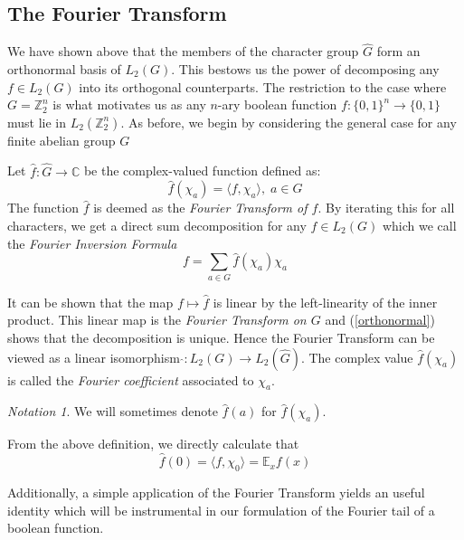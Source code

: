 \documentclass{amsart}
\theoremstyle{definition}
\theoremstyle{remark}
\numberwithin{equation}{section}
\theoremstyle{remark}
\newtheorem{notation}[theorem]{Notation}
\begin{document}
\subsection{The Fourier Transform}

We have shown above that the members of the character group $\hat{G}$ form an orthonormal basis of $L_2(G)$. This bestows us the power of decomposing any $f \in L_2(G)$ into its orthogonal counterparts. The restriction to the case where $G = \mathbb{Z}_2^n$ is what motivates us as any $n$-ary boolean function $f: \{0,1\}^n \rightarrow \{0,1\}$ must lie in $L_2(\mathbb{Z}_2^n)$. As before, we begin by considering the general case for any finite abelian group $G$  \newline

Let $\hat{f}: \hat{G} \rightarrow \mathbb{C}$ be the complex-valued function defined as:
%
\begin{equation}
  \hat{f}(\chi_a) =  \langle f, \chi_a \rangle, \; a \in G
\end{equation}
%
The function $\hat{f}$ is deemed as the \emph{Fourier Transform of $f$}. By iterating this for all characters, we get a direct sum decomposition for any $f \in L_2(G)$ which we call the \emph{Fourier Inversion Formula}\newline
%
\begin{equation}
  f = \sum_{a \in G} \hat{f}(\chi_a)\chi_a
\end{equation}

\noindent It can be shown that the map $f \mapsto \hat{f}$ is linear by the left-linearity of the inner product. This linear map is the \emph{Fourier Transform on $G$} and (\ref{orthonormal}) shows that the decomposition is unique. Hence the Fourier Transform can be viewed as a linear isomorphism $\hat{}:L_2(G) \rightarrow L_2(\hat{G})$. The complex value $\hat{f}(\chi_a)$ is called the \emph{Fourier coefficient} associated to $\chi_a$.
%
\begin{notation}
  We will sometimes denote $\hat{f}(a)$ for $\hat{f}(\chi_a)$.
\end{notation}
%
\noindent From the above definition, we directly calculate that
\begin{equation}
  \hat{f}(0) = \langle f, \chi_0 \rangle = \mathbb{E}_x f(x)
\end{equation}

\noindent Additionally, a simple application of the Fourier Transform yields an useful identity which will be instrumental in our formulation of the Fourier tail of a boolean function.
\end{document}
